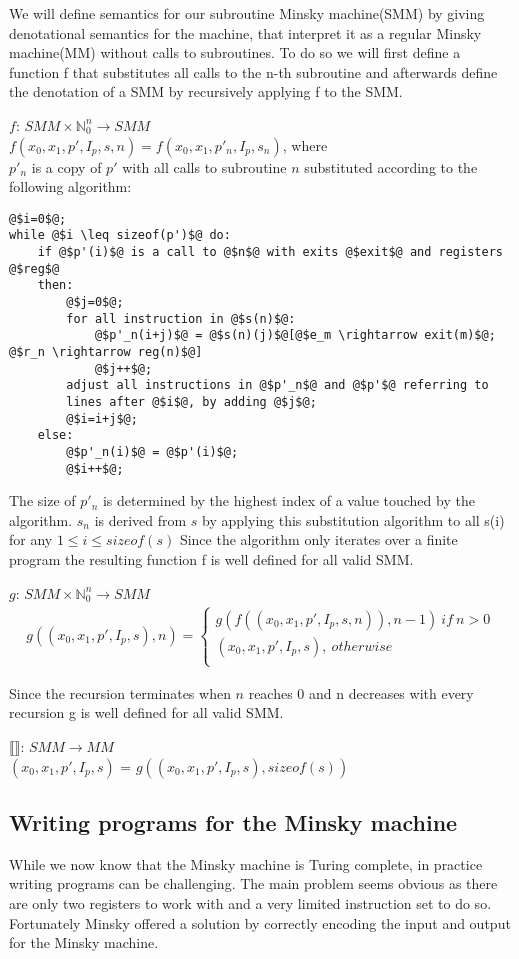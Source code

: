 We will define semantics for our subroutine Minsky machine(SMM) by giving denotational semantics for the machine, that interpret it as a regular Minsky machine(MM) without calls to subroutines. To do so we will first define a function f that substitutes all calls to the n-th subroutine and afterwards define the denotation of a SMM by recursively applying f to the SMM.
\begin{definition}
$f$: $SMM\times \mathbb{N}^n_0 \rightarrow SMM$\\
$f(x_0, x_1, p', I_p, s, n) = f(x_0, x_1, p'_n, I_p, s_n)$, where\\
$p'_n$ is a copy of $p'$ with all calls to subroutine $n$ substituted according to the following algorithm:
\begin{lstlisting}
@$i=0$@;
while @$i \leq sizeof(p')$@ do:
	if @$p'(i)$@ is a call to @$n$@ with exits @$exit$@ and registers @$reg$@ 
	then:
	 	@$j=0$@;
	 	for all instruction in @$s(n)$@:
	 	 	@$p'_n(i+j)$@ = @$s(n)(j)$@[@$e_m \rightarrow exit(m)$@; @$r_n \rightarrow reg(n)$@]
	 	 	@$j++$@;
	 	adjust all instructions in @$p'_n$@ and @$p'$@ referring to
		lines after @$i$@, by adding @$j$@;
	 	@$i=i+j$@;
	else: 
		@$p'_n(i)$@ = @$p'(i)$@;
	 	@$i++$@;
\end{lstlisting}
The size of $p'_n$ is determined by the highest index of a value touched by the algorithm.
$s_n$ is derived from $s$ by applying this substitution algorithm to all s(i) for any $1 \leq i \leq sizeof(s)$
Since the algorithm only iterates over a finite program the resulting function f is well defined for all valid SMM.

$g$: $SMM\times \mathbb{N}^n_0 \rightarrow SMM$
\begin{align*}
g((x_0, x_1, p', I_p, s), n)  = \begin{cases}
											g(f((x_0, x_1, p', I_p, s, n)), n-1)\ if\ n>0\\
											(x_0, x_1, p', I_p, s),\ otherwise\\
										\end{cases}
\end{align*}

Since the recursion terminates when $n$ reaches 0 and n decreases with every recursion g is well defined for all valid SMM. 

$\llbracket\rrbracket$: $SMM \rightarrow MM$\\
$(x_0, x_1, p', I_p, s)$ = $g((x_0, x_1, p', I_p, s), sizeof(s))$
\end{definition}

\subsection{Writing programs for the Minsky machine}
While we now know that the Minsky machine is Turing complete, in practice writing programs can be challenging.
The main problem seems obvious as there are only two registers to work with and a very limited instruction set to do so.\\
Fortunately Minsky offered a solution by correctly encoding the input and output for the Minsky machine\cite{Minsky:1967:CFI:1095587}.


